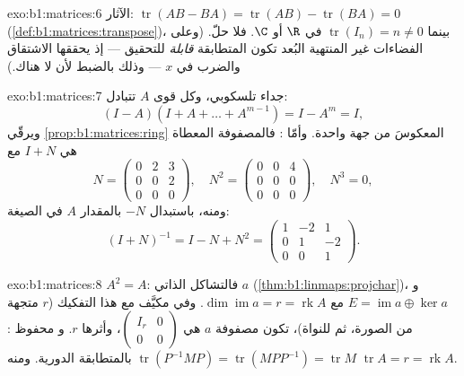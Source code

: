 \begin{solution}{exo:b1:matrices:6}
الآثار: $\operatorname{tr}(AB - BA) = \operatorname{tr}(AB) -
\operatorname{tr}(BA) = 0$ (\cref{def:b1:matrices:transpose})،
بينما $\operatorname{tr}(I_n) = n \neq 0$ في $\R$ أو $\C$. فلا
حلّ. (وعلى الفضاءات غير المنتهية البُعد تكون المتطابقة \emph{قابلة}
للتحقيق --- إذ يحققها الاشتقاق والضرب في $x$
--- وذلك بالضبط لأن لا  هناك.)
\end{solution}

\begin{solution}{exo:b1:matrices:7}
جداء تلسكوبي، وكل قوى $A$ تتبادل:
\[
(I - A)(I + A + \dots + A^{m-1}) = I - A^m = I ,
\]
ويرقّي \cref{prop:b1:matrices:ring} المعكوسَ من جهة واحدة. وأمّا
: فالمصفوفة المعطاة هي $I + N$ مع
\[
N = \begin{pmatrix} 0 & 2 & 3\\ 0 & 0 & 2\\ 0&0&0 \end{pmatrix},
\quad
N^2 = \begin{pmatrix} 0&0&4\\ 0&0&0\\ 0&0&0\end{pmatrix},
\quad N^3 = 0 ,
\]
ومنه، باستبدال $-N$ بالمقدار $A$ في الصيغة:
\[
(I + N)^{-1} = I - N + N^2 =
\begin{pmatrix}
1 & -2 & 1\\
0 & 1 & -2\\
0 & 0 & 1
\end{pmatrix}.
\]
\end{solution}

\begin{solution}{exo:b1:matrices:8}
$A^2 = A$: فالتشاكل الذاتي $a$ 
(\cref{thm:b1:linmaps:projchar})، و $E = \operatorname{im} a \oplus
\ker a$ مع $\dim\operatorname{im} a = r = \operatorname{rk} A$. وفي
 مكيَّف مع هذا التفكيك ($r$ متجهة من الصورة،
ثم  للنواة)، تكون مصفوفة $a$ هي
$\begin{pmatrix} I_r & 0\\ 0 & 0\end{pmatrix}$، وأثرها $r$. و
 محفوظ :
$\operatorname{tr}(P^{-1}MP) = \operatorname{tr}(MPP^{-1}) =
\operatorname{tr} M$ بالمتطابقة الدورية. ومنه
$\operatorname{tr} A = r = \operatorname{rk} A$.
\end{solution}

